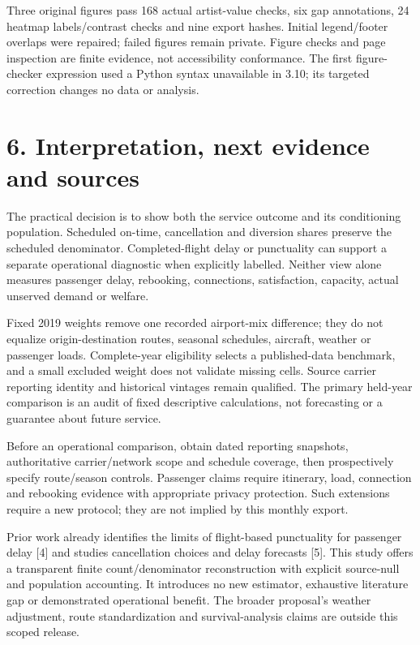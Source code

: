 \documentclass[11pt]{article}
\begin{document}
Three original figures pass 168 actual artist-value checks, six gap annotations, 24 heatmap labels/contrast checks and nine export hashes. Initial legend/footer overlaps were repaired; failed figures remain private. Figure checks and page inspection are finite evidence, not accessibility conformance. The first figure-checker expression used a Python syntax unavailable in 3.10; its targeted correction changes no data or analysis.

\newpage\section*{6. Interpretation, next evidence and sources}
The practical decision is to show both the service outcome and its conditioning population. Scheduled on-time, cancellation and diversion shares preserve the scheduled denominator. Completed-flight delay or punctuality can support a separate operational diagnostic when explicitly labelled. Neither view alone measures passenger delay, rebooking, connections, satisfaction, capacity, actual unserved demand or welfare.

Fixed 2019 weights remove one recorded airport-mix difference; they do not equalize origin-destination routes, seasonal schedules, aircraft, weather or passenger loads. Complete-year eligibility selects a published-data benchmark, and a small excluded weight does not validate missing cells. Source carrier reporting identity and historical vintages remain qualified. The primary held-year comparison is an audit of fixed descriptive calculations, not forecasting or a guarantee about future service.

Before an operational comparison, obtain dated reporting snapshots, authoritative carrier/network scope and schedule coverage, then prospectively specify route/season controls. Passenger claims require itinerary, load, connection and rebooking evidence with appropriate privacy protection. Such extensions require a new protocol; they are not implied by this monthly export.

Prior work already identifies the limits of flight-based punctuality for passenger delay [4] and studies cancellation choices and delay forecasts [5]. This study offers a transparent finite count/denominator reconstruction with explicit source-null and population accounting. It introduces no new estimator, exhaustive literature gap or demonstrated operational benefit. The broader proposal's weather adjustment, route standardization and survival-analysis claims are outside this scoped release.
\end{document}
